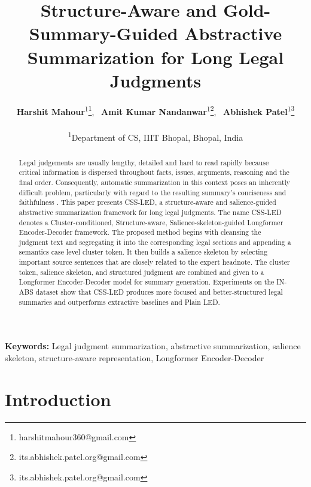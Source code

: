 \documentclass[11pt, a4paper]{article}
\theoremstyle{plain}%
\theoremstyle{remark}%
\theoremstyle{definition}%
\begin{document}
\title{\textbf{Structure-Aware and Gold-Summary-Guided Abstractive Summarization for Long Legal Judgments}}

\author{
    \textbf{Harshit Mahour}\textsuperscript{1}\thanks{harshitmahour360@gmail.com}, \ 
    \textbf{Amit Kumar Nandanwar}\textsuperscript{1}\thanks{its.abhishek.patel.org@gmail.com}, \ 
    \textbf{Abhishek Patel}\textsuperscript{1}\thanks{its.abhishek.patel.org@gmail.com} \\
    \vspace{0.2cm} \\
    \textsuperscript{1}Department of CS, IIIT Bhopal, Bhopal, India
}
\date{}

\maketitle

\begin{abstract}
Legal judgements are usually lengthy, detailed and hard to read rapidly because critical information is dispersed throughout facts, issues, arguments, reasoning and the final order. Consequently, automatic summarization in this context poses an inherently difficult problem, particularly with regard to the resulting summary’s conciseness and faithfulness . This paper presents CSS-LED, a structure-aware and salience-guided abstractive summarization framework for long legal judgments. The name CSS-LED denotes a Cluster-conditioned, Structure-aware, Salience-skeleton-guided Longformer Encoder-Decoder framework. The proposed method begins with cleansing the judgment text and segregating it into the corresponding legal sections and appending a semantics case level cluster token. It then builds a salience skeleton by selecting important source sentences that are closely related to the expert headnote. The cluster token, salience skeleton, and structured judgment are combined and given to a Longformer Encoder-Decoder model for summary generation. Experiments on the IN-ABS dataset show that CSS-LED produces more focused and better-structured legal summaries and outperforms extractive baselines and Plain LED.
\end{abstract}

\noindent\textbf{Keywords:} Legal judgment summarization, abstractive summarization, salience skeleton, structure-aware representation, Longformer Encoder-Decoder

\section{Introduction}
\end{document}

